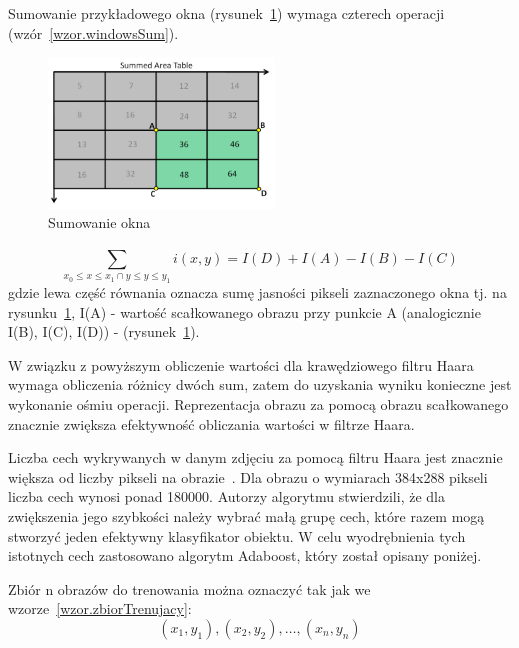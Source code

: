 \documentclass[a4paper,twoside,12pt]{book}
\begin{document}
    Sumowanie przykładowego okna (rysunek~\ref{fig.sumowanieOkna}) wymaga czterech operacji (wzór~\ref{wzor.windowsSum}).
    \begin{figure}
        \centering
        \includegraphics[width=6cm]{Obrazy/sumowanieOkna.jpg}
        \caption{Sumowanie okna~\cite{integralImages}}
        \label{fig.sumowanieOkna}
    \end{figure}


    \large
    \begin{equation}
        \sum_{x_0\leq x \leq x_1\cap {y}\leq y \leq y_1}^{} i(x,y) = I(D) + I(A) - I(B) - I(C)
        \label{wzor.windowsSum}
    \end{equation}
    \normalsize
    gdzie lewa część równania oznacza sumę jasności pikseli
    zaznaczonego okna tj.
    na rysunku~\ref{fig.sumowanieOkna}, I(A) - wartość scałkowanego obrazu przy punkcie A
    (analogicznie I(B), I(C), I(D)) - (rysunek~\ref{fig.sumowanieOkna}).

    W związku z powyższym obliczenie wartości dla krawędziowego filtru Haara wymaga obliczenia różnicy dwóch sum, zatem do uzyskania wyniku konieczne jest wykonanie
    ośmiu operacji.
    Reprezentacja obrazu za pomocą obrazu scałkowanego znacznie zwiększa efektywność obliczania wartości w filtrze
    Haara.


    Liczba cech wykrywanych w danym zdjęciu za
    pomocą filtru Haara jest znacznie większa od liczby pikseli na obrazie~\cite{violaJones}.
    Dla obrazu o wymiarach 384x288 pikseli liczba cech wynosi ponad 180000.
    Autorzy algorytmu stwierdzili, że dla zwiększenia jego szybkości należy wybrać małą grupę cech,
    które razem mogą stworzyć jeden efektywny klasyfikator obiektu.
    W celu wyodrębnienia tych istotnych cech zastosowano algorytm Adaboost, który został opisany poniżej.

    Zbiór n obrazów do trenowania można oznaczyć tak jak we wzorze~\ref{wzor.zbiorTrenujacy}:
    \large
    \begin{equation}
        (x_1, y_1), (x_2, y_2), \ldots, (x_n, y_n)
        \label{wzor.zbiorTrenujacy}
    \end{equation}
    \normalsize
\end{document}
